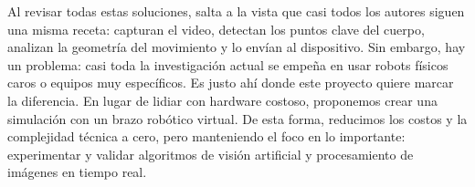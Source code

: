 Al revisar todas estas soluciones, salta a la vista que casi todos los autores siguen una misma receta: capturan el video, detectan los puntos clave del cuerpo, analizan la geometría del movimiento y lo envían al dispositivo. Sin embargo, hay un problema: casi toda la investigación actual se empeña en usar robots físicos caros o equipos muy específicos. Es justo ahí donde este proyecto quiere marcar la diferencia. En lugar de lidiar con hardware costoso, proponemos crear una simulación con un brazo robótico virtual. De esta forma, reducimos los costos y la complejidad técnica a cero, pero manteniendo el foco en lo importante: experimentar y validar algoritmos de visión artificial y procesamiento de imágenes en tiempo real.
